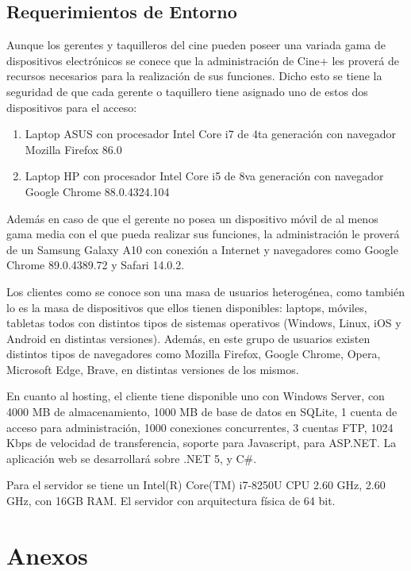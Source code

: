 \documentclass[letterpaper,12pt, oneside, onecolumn, openany]{book}
\begin{document}
\section{Requerimientos de Entorno}

Aunque los gerentes y taquilleros del cine pueden poseer una variada gama de dispositivos electrónicos se conece que la administración de Cine+ les proverá de recursos necesarios para la realización de sus funciones. Dicho esto se tiene la seguridad de que cada gerente o taquillero tiene asignado uno de estos dos dispositivos para el acceso:

\begin{enumerate}
	\item Laptop ASUS con procesador Intel Core i7 de 4ta generación con navegador Mozilla Firefox 86.0
	\item Laptop HP con procesador Intel Core i5 de 8va generación con navegador Google Chrome 88.0.4324.104
\end{enumerate}

Además en caso de que el gerente no posea un dispositivo móvil de al menos gama media con el que pueda realizar sus funciones, la administración le proverá de un Samsung Galaxy A10 con conexión a Internet y navegadores como Google Chrome 89.0.4389.72 y Safari 14.0.2. 

Los clientes como se conoce son una masa de usuarios heterogénea, como también lo es la masa de dispositivos que ellos tienen disponibles: laptops, móviles, tabletas todos con distintos tipos de sistemas operativos (Windows, Linux, iOS y Android en distintas versiones). Además, en este grupo de usuarios existen distintos tipos de navegadores como Mozilla Firefox, Google Chrome, Opera, Microsoft Edge, Brave, en distintas versiones de los mismos.

En cuanto al hosting, el cliente tiene disponible uno con Windows Server, con 4000 MB de almacenamiento, 1000 MB de base de datos en SQLite, 1 cuenta de acceso para administración, 1000 conexiones concurrentes, 3 cuentas FTP, 1024 Kbps de velocidad de transferencia, soporte para Javascript, para ASP.NET. La aplicación web se desarrollará sobre .NET 5, y C\#.

Para el servidor se tiene un Intel(R) Core(TM) i7-8250U CPU 2.60 GHz, 2.60 GHz, con 16GB RAM. El servidor con arquitectura física de 64 bit.

\chapter{Anexos}
\end{document}
